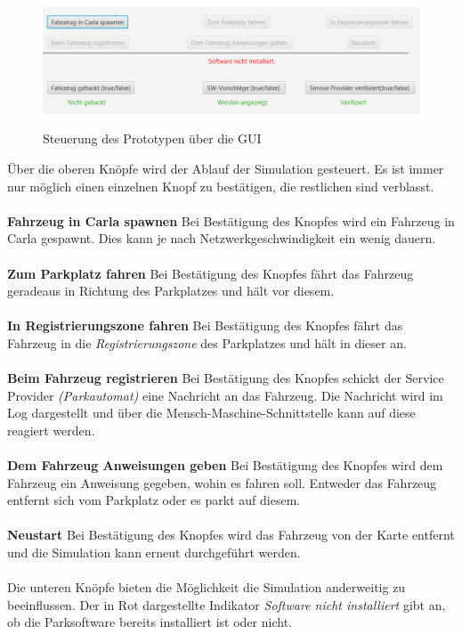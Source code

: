 \begin{figure}[H]
	\centering
	\includegraphics[width=\columnwidth]{pictures/gui_steuerung.PNG}
	\label{img:gui}
	\caption{Steuerung des Prototypen über die GUI}
\end{figure}

Über die oberen Knöpfe wird der Ablauf der Simulation gesteuert. Es ist immer nur möglich einen einzelnen Knopf zu bestätigen, die restlichen sind verblasst.\\\\
\textbf{Fahrzeug in Carla spawnen} Bei Bestätigung des Knopfes wird ein Fahrzeug in Carla gespawnt. Dies kann je nach Netzwerkgeschwindigkeit ein wenig dauern.\\
\\
\textbf{Zum Parkplatz fahren} Bei Bestätigung des Knopfes fährt das Fahrzeug geradeaus in Richtung des Parkplatzes und hält vor diesem.\\
\\
\textbf{In Registrierungszone fahren} Bei Bestätigung des Knopfes fährt das Fahrzeug in die \textit{Registrierungszone} des Parkplatzes und hält in dieser an.\\
\\
\textbf{Beim Fahrzeug registrieren} Bei Bestätigung des Knopfes schickt der Service Provider \textit{(Parkautomat)} eine Nachricht an das Fahrzeug. Die Nachricht wird im Log dargestellt und über die Mensch-Maschine-Schnittstelle kann auf diese reagiert werden. \\
\\
\textbf{Dem Fahrzeug Anweisungen geben} Bei Bestätigung des Knopfes wird dem Fahrzeug ein Anweisung gegeben, wohin es fahren soll. Entweder das Fahrzeug entfernt sich vom Parkplatz oder es parkt auf diesem.\\
\\
\textbf{Neustart} Bei Bestätigung des Knopfes wird das Fahrzeug von der Karte entfernt und die Simulation kann erneut durchgeführt werden.\\
\\
Die unteren Knöpfe bieten die Möglichkeit die Simulation anderweitig zu beeinflussen. Der in Rot dargestellte Indikator \textit{\glqq Software nicht installiert\grqq} gibt an, ob die Parksoftware bereits installiert ist oder nicht.\\

